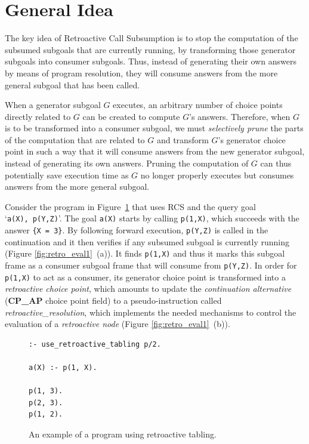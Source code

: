 \section{General Idea}

The key idea of Retroactive Call Subsumption is to stop the computation of the subsumed subgoals
that are currently running, by transforming those generator subgoals into consumer subgoals. Thus, instead
of generating their own answers by means of program resolution, they will consume answers from the more general
subgoal that has been called.

When a generator subgoal $G$ executes, an arbitrary number of choice points directly related to $G$
can be created to compute $G$'s answers. Therefore, when $G$ is to be
transformed into a consumer subgoal, we must \textit{selectively prune} the parts of the computation
that are related to $G$ and transform $G$'s generator choice point in such a way that it
will consume answers from the new generator subgoal, instead of generating its own answers.
Pruning the computation of $G$ can thus potentially save execution time as $G$ no longer properly executes
but consumes answers from the more general subgoal.

Consider the program in Figure~\ref{fig:retro_program1} that uses RCS and the query goal `\texttt{a(X),~p(Y,Z)}'.
The goal \texttt{a(X)} starts by calling \texttt{p(1,X)}, which succeeds with the answer \texttt{\{X~=~3\}}.
By following forward execution, \texttt{p(Y,Z)} is called in the continuation and it then verifies if any subsumed
subgoal is currently running (Figure \ref{fig:retro_eval1}~(a)). It finds \texttt{p(1,X)} and thus it marks this
subgoal frame as a consumer subgoal frame that will consume from \texttt{p(Y,Z)}.
In order for \texttt{p(1,X)} to act as a consumer, its generator choice point is transformed into
a \textit{retroactive choice point}, which amounts to update the \textit{continuation alternative}
(\textbf{CP\_AP} choice point field) to a pseudo-instruction called \textit{retroactive\_resolution},
which implements the needed mechanisms to control the evaluation of a \textit{retroactive node}
(Figure \ref{fig:retro_eval1}~(b)).

\begin{figure}[ht]
\begin{Verbatim}
:- use_retroactive_tabling p/2.

a(X) :- p(1, X).

p(1, 3).
p(2, 3).
p(1, 2).
\end{Verbatim}
\caption{An example of a program using retroactive tabling.}
\label{fig:retro_program1}
\end{figure}

